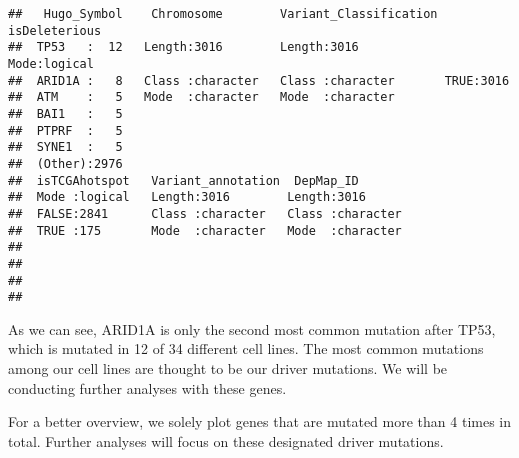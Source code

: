 \documentclass[]{article}
\begin{document}
\begin{verbatim}
##   Hugo_Symbol    Chromosome        Variant_Classification isDeleterious 
##  TP53   :  12   Length:3016        Length:3016            Mode:logical  
##  ARID1A :   8   Class :character   Class :character       TRUE:3016     
##  ATM    :   5   Mode  :character   Mode  :character                     
##  BAI1   :   5                                                           
##  PTPRF  :   5                                                           
##  SYNE1  :   5                                                           
##  (Other):2976                                                           
##  isTCGAhotspot   Variant_annotation  DepMap_ID        
##  Mode :logical   Length:3016        Length:3016       
##  FALSE:2841      Class :character   Class :character  
##  TRUE :175       Mode  :character   Mode  :character  
##                                                       
##                                                       
##                                                       
## 
\end{verbatim}

As we can see, ARID1A is only the second most common mutation after
TP53, which is mutated in 12 of 34 different cell lines. The most common
mutations among our cell lines are thought to be our driver mutations.
We will be conducting further analyses with these genes.

For a better overview, we solely plot genes that are mutated more than 4
times in total. Further analyses will focus on these designated driver
mutations.
\end{document}
